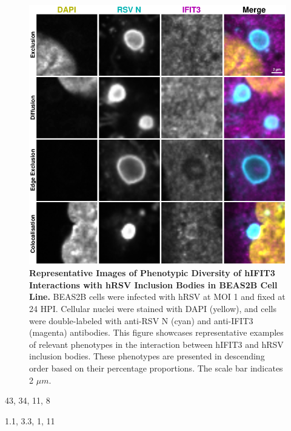 \begin{figure}
    \centering
    \includegraphics[width=1\linewidth]{08. Chapter 3/Figs/02. Infection/03. IFIT3/06. beas2b i3.pdf}
    \caption[Representative Images of Phenotypic Diversity of hIFIT3 Interactions with hRSV Inclusion Bodies in BEAS2B Cell Line]{\textbf{Representative Images of Phenotypic Diversity of hIFIT3 Interactions with hRSV Inclusion Bodies in BEAS2B Cell Line.} BEAS2B cells were infected with hRSV at MOI 1 and fixed at 24 HPI. Cellular nuclei were stained with DAPI (yellow), and cells were double-labeled with anti-RSV N (cyan) and anti-IFIT3 (magenta) antibodies. This figure showcases representative examples of relevant phenotypes in the interaction between hIFIT3 and hRSV inclusion bodies. These phenotypes are presented in descending order based on their percentage proportions. The scale bar indicates 2 \(\mu m\).}
    \label{fig:Representative Images of Phenotypic Diversity of hIFIT3 Interactions with hRSV Inclusion Bodies in BEAS2B Cell Line}
\end{figure}

43, 34, 11, 8

1.1, 3.3, 1, 11

